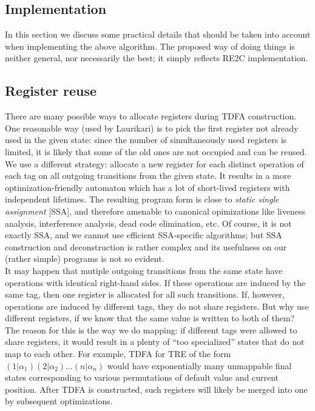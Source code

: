 \documentclass{article}
\theoremstyle{definition}
\begin{document}
\begin{multicols}{2}
\section{Implementation}\label{section_implementation}

In this section we discuss some practical details that should be taken into account when implementing the above algorithm.
The proposed way of doing things is neither general, nor necessarily the best;
it simply reflects RE2C implementation.

\subsection*{Register reuse}

There are many possible ways to allocate registers during TDFA construction.
One reasonable way (used by Laurikari) is to pick the first register not already used in the given state:
since the number of simultaneously used registers is limited,
it is likely that some of the old ones are not occupied and can be reused.
We use a different strategy: allocate a new register for each distinct operation of each tag on all outgoing transitions from the given state.
It results in a more optimization-friendly automaton
which has a lot of short-lived registers with independent lifetimes.
The resulting program form is close to \emph{static single assignment} [SSA],
and therefore amenable to canonical opimizations like liveness analysis, interference analysis, dead code elimination, etc.
Of course, it is not exactly SSA, and we cannot use efficient SSA-specific algorithms;
but SSA construction and deconstruction is rather complex and its usefulness on our (rather simple) programs is not so evident.
\\

It may happen that mutiple outgoing transitions from the same state have operations with identical right-hand sides.
If these operations are induced by the same tag, then one register is allocated for all such transitions.
If, however, operations are induced by different tags, they do not share registers.
But why use different registers, if we know that the same value is written to both of them?
The reason for this is the way we do mapping: if different tags were allowed to share registers,
it would result in a plenty of ``too specialized'' states that do not map to each other.
For example, TDFA for TRE of the form $(1 | \alpha_1) (2 | \alpha_2) \dots (n | \alpha_n)$
would have exponentially many unmappable final states
corresponding to various permutations of default value and current position.
After TDFA is constructed, such registers will likely be merged into one by subsequent optimizations.


\end{multicols}
\end{document}
